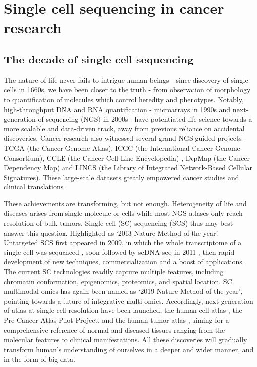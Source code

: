 \section{Single cell sequencing in cancer research}

\subsection{The decade of single cell sequencing}

The nature of life never fails to intrigue human beings - since discovery of single cells in 1660s, we have been closer to the truth - from observation of morphology to quantification of molecules which control heredity and phenotypes. Notably, high-throughput DNA and RNA quantification - microarrays in 1990s and next-generation of sequencing (NGS) in 2000s - have potentiated life science towards a more scalable and data-driven track, away from previous reliance on accidental discoveries. Cancer research also witnessed several grand NGS guided projects - TCGA (the Cancer Genome Atlas), ICGC (the International Cancer Genome Consortium), CCLE (the Cancer Cell Line Encyclopedia) \citep{ghandi2019next}, DepMap (the Cancer Dependency Map) \citep{tsherniak2017defining} and LINCS (the Library of Integrated Network-Based Cellular Signatures). These large-scale datasets greatly empowered cancer studies and clinical translations.

These achievements are transforming, but not enough. Heterogeneity of life and diseases arises from single molecule or cells while most NGS atlases only reach resolution of bulk tumors. Single cell (SC) sequencing (SCS) thus may best answer this question. Highlighted as `2013 Nature Method of the year'. Untargeted SCS first appeared in 2009, in which the whole transcriptome of a single cell was sequenced \citep{tang2009mrna}, soon followed by scDNA-seq in 2011 \citep{navin2011tumour}, then rapid development of new techniques, commercialization and a boost of applications. The current SC technologies readily capture multiple features, including chromatin conformation, epigenomics, proteomics, and spatial location. SC multimodal omics has again been named as `2019 Nature Method of the year', pointing towards a future of integrative multi-omics. Accordingly, next generation of atlas at single cell resolution have been launched, the human cell atlas \citep{regev2017human}, the Pre-Cancer Atlas Pilot Project, and the human tumor atlas \citep{rozenblatt2020human}, aiming for a comprehensive reference of normal and diseased tissues ranging from the molecular features to clinical manifestations. All these discoveries will gradually transform human’s understanding of ourselves in a deeper and wider manner, and in the form of big data. 

